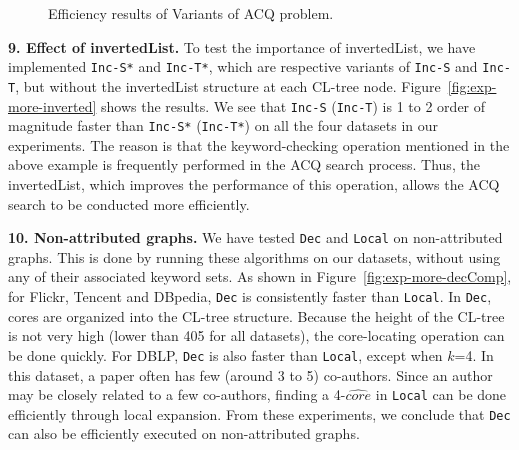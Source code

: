 \begin{figure}[htb]
\begin{tabular}{c c c c}
\end{tabular}
\caption{Efficiency results of Variants of ACQ problem.}
\label{fig:exp-variant}
\end{figure}


\textbf{9. Effect of invertedList.}
To test the importance of invertedList, we have implemented {\tt Inc-S*} and {\tt Inc-T*}, which are respective variants of {\tt Inc-S} and {\tt Inc-T}, but without the invertedList structure at each CL-tree node. Figure~\ref{fig:exp-more-inverted} shows the results. We see that {\tt Inc-S} ({\tt Inc-T}) is 1 to 2 order of magnitude faster than {\tt Inc-S*} ({\tt Inc-T*}) on all the four datasets in our experiments.
The reason is that the keyword-checking operation mentioned in the above example is frequently performed in the ACQ search process. Thus, the invertedList, which improves the performance of this operation, allows the ACQ search to be conducted more efficiently.

\textbf{10. Non-attributed graphs.}
We have tested {\tt Dec} and {\tt Local} on non-attributed graphs. This is done by running these algorithms on our datasets, without using any of their associated keyword sets. As shown in Figure~\ref{fig:exp-more-decComp}, for Flickr, Tencent and DBpedia, {\tt Dec} is consistently faster than {\tt Local}. In {\tt Dec}, cores are organized into the CL-tree structure. Because the height of the CL-tree is not very high (lower than 405 for all datasets), the core-locating operation can be done quickly. For DBLP, {\tt Dec} is also  faster than {\tt Local}, except when $k$=4. In this dataset, a paper often has few (around 3 to 5) co-authors. Since an author may be closely related to a few co-authors, finding a 4-$\widehat {core}$ in {\tt Local} can be done efficiently through local expansion.  From these experiments, we conclude that {\tt Dec} can also be efficiently executed on non-attributed graphs.

